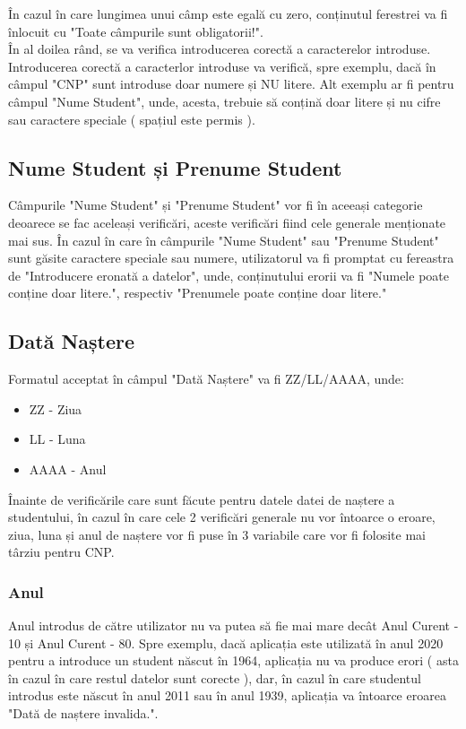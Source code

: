 \documentclass{article}
\begin{document}
		În cazul în care lungimea unui câmp este egală cu zero, conținutul ferestrei va fi înlocuit cu "Toate câmpurile sunt obligatorii!". \\

		În al doilea rând, se va verifica introducerea corectă a caracterelor introduse. Introducerea corectă a caracterlor introduse va verifică, spre exemplu, dacă în câmpul "CNP" sunt introduse doar numere și NU litere. Alt exemplu ar fi pentru câmpul "Nume Student", unde, acesta, trebuie să conțină doar litere și nu cifre sau caractere speciale ( spațiul este permis ).

		\subsection*{Nume Student și Prenume Student}
		
		Câmpurile "Nume Student" și "Prenume Student" vor fi în aceeași categorie deoarece se fac aceleași verificări, aceste verificări fiind cele generale menționate mai sus. În cazul în care
în câmpurile "Nume Student" sau "Prenume Student" sunt găsite caractere speciale sau numere, utilizatorul va fi promptat cu fereastra de "Introducere eronată a datelor", unde, conținutului erorii va fi "Numele poate conține doar litere.", respectiv "Prenumele poate conține doar litere."

		\subsection*{Dată Naștere}

		Formatul acceptat în câmpul "Dată Naștere" va fi ZZ/LL/AAAA, unde:
		\begin{itemize}
			\item ZZ - Ziua
			\item LL - Luna
			\item AAAA - Anul
		\end{itemize}		

		Înainte de verificările care sunt făcute pentru datele datei de naștere a studentului, în cazul în care cele 2 verificări generale nu vor întoarce o eroare, ziua, luna și anul de naștere vor fi puse în 3 variabile care vor fi folosite mai târziu pentru CNP.  

		\subsubsection*{Anul}
		 Anul introdus de către utilizator nu va putea să fie mai mare decât Anul Curent - 10 și Anul Curent - 80. Spre exemplu, dacă aplicația este utilizată în anul 2020 pentru a introduce un student născut în 1964, aplicația nu va produce erori ( asta în cazul în care restul datelor sunt corecte ), dar, în cazul în care studentul introdus este născut în anul 2011 sau în anul 1939, aplicația va întoarce eroarea "Dată de naștere invalida.".
		
\end{document}
